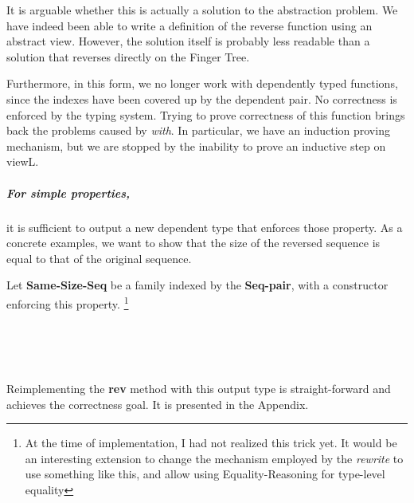 \documentclass[12pt,twoside,notitlepage]{report}
\begin{document}
It is arguable whether this is actually a solution to the abstraction problem. We have indeed been able to write a definition of the reverse function using an abstract view. However, the solution itself is probably less readable than a solution that reverses directly on the Finger Tree.

Furthermore, in this form, we no longer work with dependently typed functions, since the indexes have been covered up by the dependent pair. No correctness is enforced by the typing system. Trying to prove correctness of this function brings back the problems caused by \textit{with}. In particular, we have an induction proving mechanism, but we are stopped by the inability to prove an inductive step on viewL.

\subparagraph{For simple properties,} it is sufficient to output a new dependent type that enforces those property. As a concrete examples, we want to show that the size of the reversed sequence is equal to that of the original sequence.

Let \textbf{Same-Size-Seq} be a family indexed by the \textbf{Seq-pair}, with a constructor enforcing this property. \footnote{At the time of implementation, I had not realized this trick yet. It would be an interesting extension to change the mechanism employed by the \textit{rewrite} to use something like this, and allow using Equality-Reasoning for type-level equality}

\begin{code}
\\
\>[4]\<[6]%
\>[6]  \AgdaSymbol{:} \AgdaSymbol{(} \AgdaSymbol{:}  \AgdaSymbol{\{}\AgdaSymbol{\})}    \<%
\\
\>[6]\<[8]%
\>[8] \AgdaSymbol{:}  \AgdaSymbol{\{}\AgdaSymbol{\}} \AgdaSymbol{\{}\AgdaSymbol{\}}  \AgdaSymbol{(}  \AgdaSymbol{)}  \AgdaSymbol{(}  \AgdaSymbol{)}  \AgdaSymbol{(}  \AgdaSymbol{)}   \<%
\\
%
\end{code}

Reimplementing the \textbf{rev} method with this output type is straight-forward and achieves the correctness goal. It is presented in the Appendix.
\end{document}
